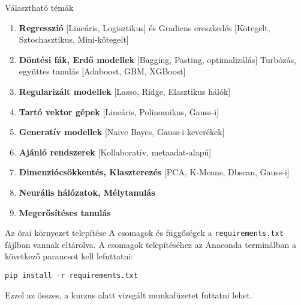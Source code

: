 \documentclass[english, aspectratio=169]{beamer}
\begin{document}
\begin{frame}{Választható témák}
\begin{enumerate}
	\item \textbf{Regresszió} [Lineáris, Logisztikus] és Gradiens ereszkedés [Kötegelt, Sztochasztikus, Mini-kötegelt]
	\item \textbf{Döntési fák, Erdő modellek} [Bagging, Pasting, optimalizálás] Turbózás, együttes tanulás [Adaboost, GBM, XGBoost]
	\item \textbf{Regularizált modellek} [Lasso, Ridge, Elasztikus hálók]
	\item \textbf{Tartó vektor gépek} [Lineáris, Polinomikus, Gauss-i]
	\item \textbf{Generatív modellek} [Naive Bayes, Gauss-i keverékek]
	\item \textbf{Ajánló rendszerek} [Kollaboratív, metaadat-alapú]
	\item \textbf{Dimenziócsökkentés, Klaszterezés} [PCA, K-Means, Dbscan, Gauss-i]
	\item \textbf{Neurális hálózatok, Mélytanulás}
	\item \textbf{Megerősítéses tanulás}
\end{enumerate}
\end{frame}

\begin{frame}{Az órai környezet telepítése}
A csomagok és függőségek a \texttt{requirements.txt} fájlban vannak eltárolva. A csomagok telepítéséhez az Anaconda terminálban a következő parancsot kell lefuttatni:
\begin{block}{}
\texttt{pip install -r requirements.txt}
\end{block}
Ezzel az összes, a kurzus alatt vizsgált munkafüzetet futtatni lehet.
\end{frame}
\end{document}
